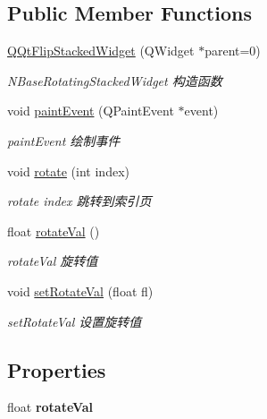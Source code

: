 \subsection*{Public Member Functions}
\begin{DoxyCompactItemize}
\item 
\mbox{\hyperlink{class_q_qt_flip_stacked_widget_a8b3e87866ae036c3e9dbaaac1175254a}{Q\+Qt\+Flip\+Stacked\+Widget}} (Q\+Widget $\ast$parent=0)
\begin{DoxyCompactList}\small\item\em N\+Base\+Rotating\+Stacked\+Widget 构造函数 \end{DoxyCompactList}\item 
\mbox{\label{class_q_qt_flip_stacked_widget_a2bfc4edb91e0e48a20c69743c4c015b6}} 
void \mbox{\hyperlink{class_q_qt_flip_stacked_widget_a2bfc4edb91e0e48a20c69743c4c015b6}{paint\+Event}} (Q\+Paint\+Event $\ast$event)
\begin{DoxyCompactList}\small\item\em paint\+Event 绘制事件 \end{DoxyCompactList}\item 
\mbox{\label{class_q_qt_flip_stacked_widget_ad8be8e253eb0d21258991f46fe85c170}} 
void \mbox{\hyperlink{class_q_qt_flip_stacked_widget_ad8be8e253eb0d21258991f46fe85c170}{rotate}} (int index)
\begin{DoxyCompactList}\small\item\em rotate index 跳转到索引页 \end{DoxyCompactList}\item 
float \mbox{\hyperlink{class_q_qt_flip_stacked_widget_a44b52da1be95ffa6fbdeb7217fc6780b}{rotate\+Val}} ()
\begin{DoxyCompactList}\small\item\em rotate\+Val 旋转值 \end{DoxyCompactList}\item 
void \mbox{\hyperlink{class_q_qt_flip_stacked_widget_a5bcfb398a82a9fdab8aa0ec56eb2f883}{set\+Rotate\+Val}} (float fl)
\begin{DoxyCompactList}\small\item\em set\+Rotate\+Val 设置旋转值 \end{DoxyCompactList}\end{DoxyCompactItemize}
\subsection*{Properties}
\begin{DoxyCompactItemize}
\item 
\mbox{\label{class_q_qt_flip_stacked_widget_a14c6c40df1a8a72ffe53d9a38b0b1cb5}} 
float {\bfseries rotate\+Val}
\end{DoxyCompactItemize}


